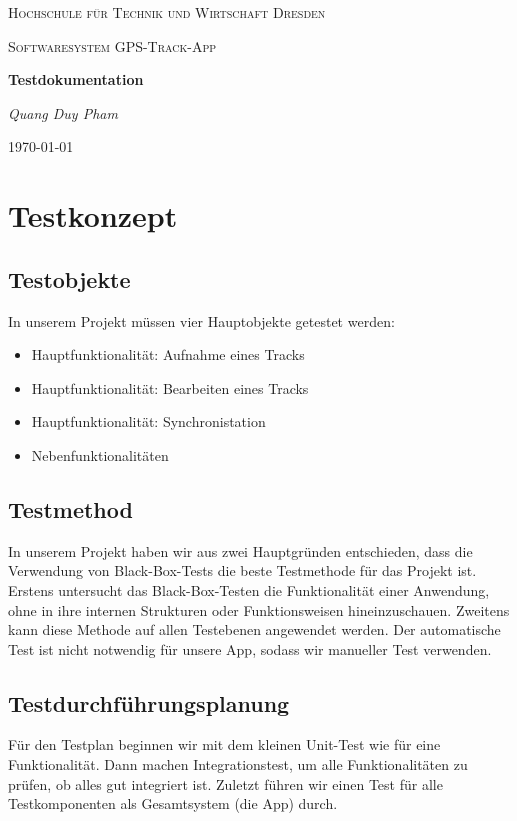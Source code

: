 \documentclass{article}
\begin{document}
\begin{titlepage}
    \centering
    {\scshape\LARGE Hochschule für Technik und Wirtschaft Dresden \par}
    \vspace{1cm}
    {\scshape\Large Softwaresystem \glqq GPS-Track-App\grqq\par}
    \vspace{1.5cm}
    {\huge\bfseries Testdokumentation\par}
    \vspace{2cm}
    {\Large\itshape Quang Duy Pham\par}
    \vfill

    {\large \today\par}
\end{titlepage}
\tableofcontents
\newpage

\section{Testkonzept}
\subsection{Testobjekte}
	In unserem Projekt müssen vier Hauptobjekte getestet werden:
	\begin{itemize}
		\item Hauptfunktionalität: Aufnahme eines Tracks
		\item Hauptfunktionalität: Bearbeiten eines Tracks
		\item Hauptfunktionalität: Synchronistation
		\item Nebenfunktionalitäten
	\end{itemize}

\subsection{Testmethod}
	In unserem Projekt haben wir aus zwei Hauptgründen entschieden, dass die Verwendung von Black-Box-Tests die beste Testmethode für das Projekt ist. Erstens untersucht das Black-Box-Testen die Funktionalität einer Anwendung, ohne in ihre internen Strukturen oder Funktionsweisen hineinzuschauen. Zweitens kann diese Methode auf allen Testebenen angewendet werden. Der automatische Test ist nicht notwendig für unsere App, sodass wir manueller Test verwenden.\par

\subsection{Testdurchführungsplanung}
	Für den Testplan beginnen wir mit dem kleinen Unit-Test wie für eine Funktionalität. Dann machen Integrationstest, um alle Funktionalitäten zu prüfen, ob alles gut integriert ist. Zuletzt führen wir einen Test für alle Testkomponenten als Gesamtsystem (die App) durch.\par
\end{document}
